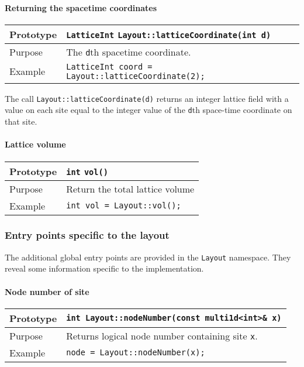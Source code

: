 \documentclass[12pt,letterpaper]{article}
\newcommand{\tLatticeInt}{LatticeInt}
\begin{document}
\paragraph{Returning the spacetime coordinates}

\begin{flushleft}
  \begin{tabular}{|l|l|}
  \hline
  Prototype      & {\tt \tLatticeInt} \verb|Layout::latticeCoordinate(int d)|\\
  \hline
  Purpose        & The {\tt d}th spacetime coordinate. \\
  \hline
  Example        & {\tt \tLatticeInt{} coord = Layout::latticeCoordinate(2);} \\
  \hline
 \end{tabular}
\end{flushleft}
%
The call \verb|Layout::latticeCoordinate(d)| returns an integer lattice field with a
value on each site equal to the integer value of the \verb|d|th
space-time coordinate on that site.

\paragraph{Lattice volume}

\begin{flushleft}
  \begin{tabular}{|l|l|}
  \hline
  Prototype      & {\tt int} \verb|vol()|\\
  \hline
  Purpose        & Return the total lattice volume\\
  \hline
  Example        & {\tt int vol = Layout::vol();} \\
  \hline
 \end{tabular}
\end{flushleft}

\subsubsection{Entry points specific to the layout}
        
The additional global entry points are provided in the \verb|Layout| namespace.
They reveal some information specific to the implementation.

\paragraph{Node number of site}

\begin{flushleft}
  \begin{tabular}{|l|l|}
  \hline
  Prototype      & \verb|int Layout::nodeNumber(const multi1d<int>& x)|\\
    \hline
  Purpose        & Returns logical node number containing site \verb|x|. \\
\hline
  Example  & \verb|node = Layout::nodeNumber(x);| \\
   \hline
 \end{tabular}
\end{flushleft}
\end{document}
